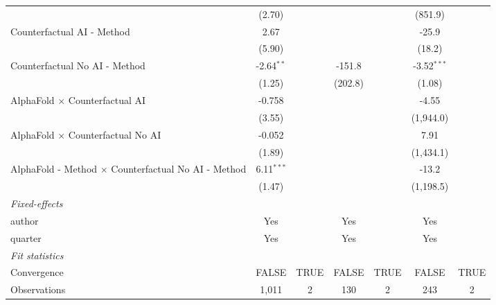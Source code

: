 \begin{tabular}{lcccccc}
                                                              & (2.70)        &      &              &      & (851.9)       &   \\   
   Counterfactual AI - Method                                 & 2.67          &      &              &      & -25.9         &   \\   
                                                              & (5.90)        &      &              &      & (18.2)        &   \\   
   Counterfactual No AI - Method                              & -2.64$^{**}$  &      & -151.8       &      & -3.52$^{***}$ &   \\   
                                                              & (1.25)        &      & (202.8)      &      & (1.08)        &   \\   
   AlphaFold $\times$ Counterfactual AI                       & -0.758        &      &              &      & -4.55         &   \\   
                                                              & (3.55)        &      &              &      & (1,944.0)     &   \\   
   AlphaFold $\times$ Counterfactual No AI                    & -0.052        &      &              &      & 7.91          &   \\   
                                                              & (1.89)        &      &              &      & (1,434.1)     &   \\   
   AlphaFold - Method $\times$ Counterfactual No AI - Method  & 6.11$^{***}$  &      &              &      & -13.2         &   \\   
                                                              & (1.47)        &      &              &      & (1,198.5)     &   \\   
   \midrule
   \emph{Fixed-effects}\\
   author                                                     & Yes           &      & Yes          &      & Yes           & \\  
   quarter                                                    & Yes           &      & Yes          &      & Yes           & \\  
   \midrule
   \emph{Fit statistics}\\
   Convergence                                                &FALSE          & TRUE & FALSE        & TRUE & FALSE         & TRUE\\  
   Observations                                               & 1,011         & 2    & 130          & 2    & 243           & 2\\  

\end{tabular}
